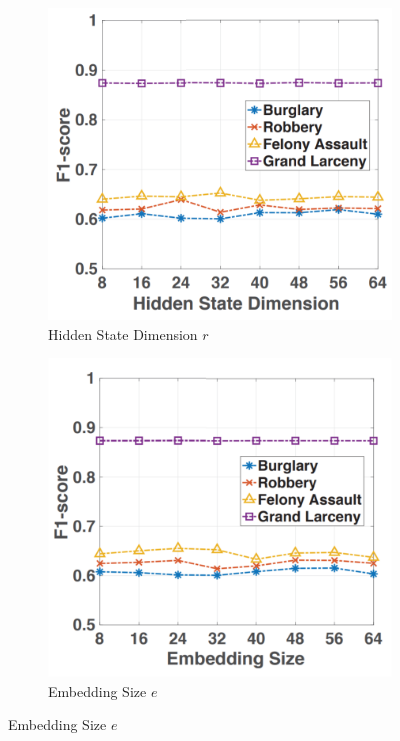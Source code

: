 \newpage
\begin{figure}[!htb]
    \captionsetup[subfigure]{font=small,labelfont=small}
    \centering
    \vspace{3cm}
    \begin{subfigure}{0.45\textwidth}
        \centering
        \includegraphics[width=0.9\linewidth]{Chapter5/Images/f1/a.png} 
        \caption{Hidden State Dimension $r$}
        \label{fig:f11}
    \end{subfigure}
    \begin{subfigure}{0.45\textwidth}
        \centering
        \includegraphics[width=0.9\linewidth]{Chapter5/Images/f1/b.png}
        \caption{Embedding Size $e$}
        \label{fig:f12}
    \end{subfigure}


\end{figure}
